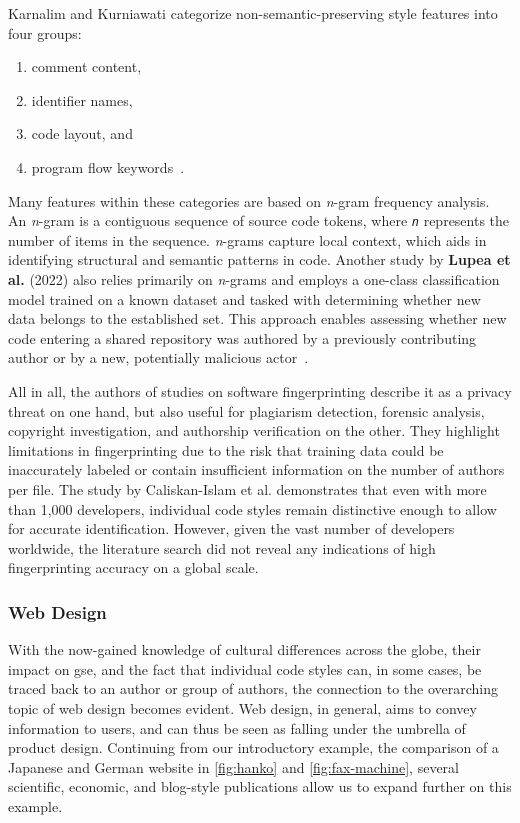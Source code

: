 Karnalim and Kurniawati categorize non-semantic-preserving style features into four groups:

\begin{enumerate}
    \item comment content,
    \item identifier names,
    \item code layout, and
    \item program flow keywords~\cite{Karnalim2020}.
\end{enumerate}

Many features within these categories are based on \textit{n}-gram frequency analysis.
An \textit{n}-gram is a contiguous sequence of source code tokens, where \textit{\texttt{n}} represents the number of items in the sequence.
\textit{n}-grams capture local context, which aids in identifying structural and semantic patterns in code.
Another study by \textbf{Lupea et al.} (2022) also relies primarily on \textit{n}-grams and employs a one-class classification model trained on a known dataset and tasked with determining whether new data belongs to the established set.
This approach enables assessing whether new code entering a shared repository was authored by a previously contributing author or by a new, potentially malicious actor~\cite{Lupea2022}.

All in all, the authors of studies on software fingerprinting describe it as a privacy threat on one hand, but also useful for plagiarism detection, forensic analysis, copyright investigation, and authorship verification on the other.
They highlight limitations in fingerprinting due to the risk that training data could be inaccurately labeled or contain insufficient information on the number of authors per file.
The study by Caliskan-Islam et al. demonstrates that even with more than 1,000 developers, individual code styles remain distinctive enough to allow for accurate identification.
However, given the vast number of developers worldwide, the literature search did not reveal any indications of high fingerprinting accuracy on a global scale.


\subsubsection{Web Design}
\label{sec:related-work-culture-web-design}

With the now-gained knowledge of cultural differences across the globe, their impact on \ac{gse}, and the fact that individual code styles can, in some cases, be traced back to an author or group of authors, the connection to the overarching topic of web design becomes evident.
Web design, in general, aims to convey information to users, and can thus be seen as falling under the umbrella of product design.
Continuing from our introductory example, the comparison of a Japanese and German website in \cref{fig:hanko} and \cref{fig:fax-machine}, several scientific, economic, and blog-style publications allow us to expand further on this example.

